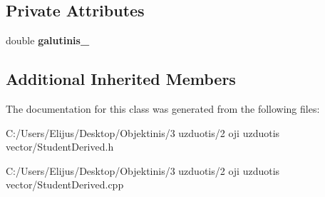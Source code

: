 \subsection*{Private Attributes}
\begin{DoxyCompactItemize}
\item 
\mbox{\label{class_student_derived_aba98ad07d71e74bc0c0c8e5be5d2ff81}} 
double {\bfseries galutinis\+\_\+}
\end{DoxyCompactItemize}
\subsection*{Additional Inherited Members}


The documentation for this class was generated from the following files\+:\begin{DoxyCompactItemize}
\item 
C\+:/\+Users/\+Elijus/\+Desktop/\+Objektinis/3 uzduotis/2 oji uzduotis vector/Student\+Derived.\+h\item 
C\+:/\+Users/\+Elijus/\+Desktop/\+Objektinis/3 uzduotis/2 oji uzduotis vector/Student\+Derived.\+cpp\end{DoxyCompactItemize}
